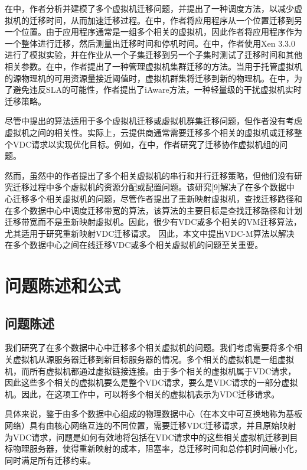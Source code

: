 在\cite{zhang2013scheduling}中，作者分析并建模了多个虚拟机迁移问题，并提出了一种调度方法，以减少虚拟机的迁移时间，从而加速迁移过程。在\cite{keller2012live}中，作者将应用程序从一个位置迁移到另一个位置。由于应用程序通常是一组多个相关的虚拟机，因此作者将应用程序作为一个整体进行迁移，然后测量出迁移时间和停机时间。在\cite{atif2014adaptive}中，作者使用Xen 3.3.0进行了模拟实验，并在作业从一个子集迁移到另一个子集时测试了迁移时间和其他相关参数。在\cite{yang2014method}中，作者提出了一种管理虚拟机集群迁移的方法。当用于托管虚拟机的源物理机的可用资源量接近阈值时，虚拟机群集将迁移到新的物理机。在\cite{xu2013iaware}中，为了避免违反SLA的可能性，作者提出了iAware方法，一种轻量级的干扰虚拟机实时迁移策略。

尽管\cite{zhang2013scheduling, keller2012live, atif2014adaptive, yang2014method, xu2013iaware}中提出的算法适用于多个虚拟机迁移或虚拟机群集迁移问题，但作者没有考虑虚拟机之间的相关性。实际上，云提供商通常需要迁移多个相关的虚拟机或迁移整个VDC请求以实现优化目标。例如，在\cite{cerroni2014multiple, callegati2013live}中，作者研究了迁移协作虚拟机组的问题。

然而，虽然\cite{cerroni2014multiple, callegati2013live}中的作者提出了多个相关虚拟机的串行和并行迁移策略，但他们没有研究迁移过程中多个虚拟机的资源分配或配置问题。该研究[9]解决了在多个数据中心迁移多个相关虚拟机的问题，尽管作者提出了重新映射虚拟机，查找迁移路径和在多个数据中心中调度迁移带宽的算法，该算法的主要目标是查找迁移路径和计划迁移带宽而不是重新映射虚拟机。因此，很少有VDC或多个相关的VM迁移算法，尤其适用于研究重新映射VDC迁移请求。
因此，本文中提出VDC-M算法以解决在多个数据中心之间在线迁移VDC或多个相关虚拟机的问题至关重要。

\chapter{问题陈述和公式}

\section{问题陈述}
我们研究了在多个数据中心中迁移多个相关虚拟机的问题。我们考虑需要将多个相关虚拟机从源服务器迁移到新目标服务器的情况。多个相关的虚拟机是一组虚拟机，而所有虚拟机都通过虚拟链接连接。由于多个相关的虚拟机属于VDC请求，因此这些多个相关的虚拟机要么是整个VDC请求，要么是VDC请求的一部分虚拟机。因此，在这项工作中，可以将多个相关的虚拟机表示为VDC迁移请求。

具体来说，鉴于由多个数据中心组成的物理数据中心（在本文中可互换地称为基板网络）具有由核心网络互连的不同位置，需要迁移VDC迁移请求，并且原始映射为VDC请求，问题是如何有效地将包括在VDC请求中的这些相关虚拟机迁移到目标物理服务器，使得重新映射的成本，阻塞率，总迁移时间和总停机时间最小化，同时满足所有迁移约束。

